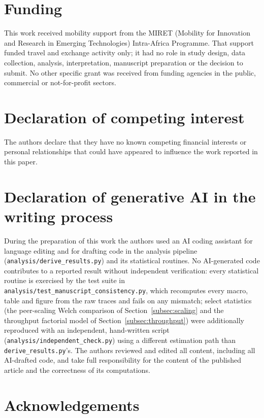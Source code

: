 \documentclass[a4paper,fleqn]{cas-sc}
\begin{document}
\section*{Funding}

This work received mobility support from the MIRET (Mobility for
Innovation and Research in Emerging Technologies) Intra-Africa Programme.
That support funded travel and exchange activity only; it had no role in
study design, data collection, analysis, interpretation, manuscript
preparation or the decision to submit. No other specific grant was
received from funding agencies in the public, commercial or
not-for-profit sectors.

\section*{Declaration of competing interest}

The authors declare that they have no known competing financial interests or
personal relationships that could have appeared to influence the work
reported in this paper.

\section*{Declaration of generative AI in the writing process}

During the preparation of this work the authors used an AI coding assistant
for language editing and for drafting code in the analysis pipeline
(\texttt{analysis/derive\_results.py}) and its statistical routines. No
AI-generated code contributes to a reported result without independent
verification: every statistical routine is exercised by the test suite in
\texttt{analysis/test\_manuscript\_consistency.py}, which recomputes every
macro, table and figure from the raw traces and fails on any mismatch;
select statistics (the peer-scaling Welch comparison of
Section~\ref{subsec:scaling} and the throughput factorial model of
Section~\ref{subsec:throughput}) were additionally reproduced with an
independent, hand-written script (\texttt{analysis/independent\_check.py})
using a different estimation path than \texttt{derive\_results.py}'s. The
authors reviewed and edited all content, including all AI-drafted code,
and take full responsibility for the content of the published article and
the correctness of its computations.

\section*{Acknowledgements}
\end{document}
